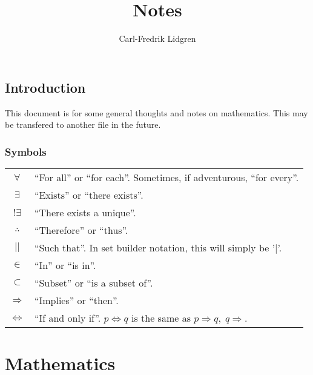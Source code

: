 \documentclass[12pt,a4paper]{report}
\title{Notes}
\author{Carl-Fredrik Lidgren}
\begin{document}
\maketitle
\tableofcontents
\clearpage

\section{Introduction}
This document is for some general thoughts and notes on mathematics. This may be
transfered to another file in the future.
\subsection{Symbols}
\begin{tabular}{c p{12.5cm}}
  $\forall$ & ``For all'' or ``for each''. Sometimes, if adventurous, ``for every''.\\
  $\exists$ & ``Exists'' or ``there exists''.\\
  $!\exists$ & ``There exists a unique''.\\
  $\therefore$ & ``Therefore'' or ``thus''.\\
  $||$ & ``Such that''. In set builder notation, this will simply be '$|$'.\\
  $\in$ & ``In'' or ``is in''.\\
  $\subset$ & ``Subset'' or ``is a subset of''.\\
  $\Rightarrow$ & ``Implies'' or ``then''.\\
  $\Leftrightarrow$ & ``If and only if''. $p \Leftrightarrow q$ is the same as $p \Rightarrow q,\;q\Rightarrow$.
\end{tabular}

\chapter{Mathematics}
\clearpage
\end{document}
